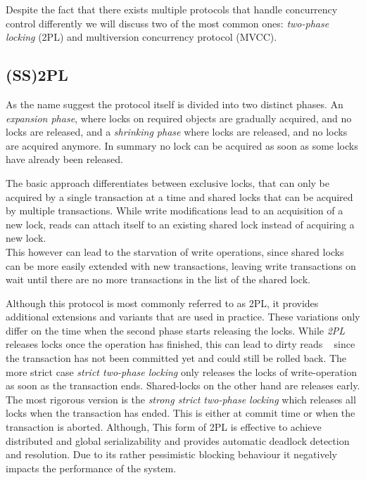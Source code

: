 Despite the fact that there exists multiple protocols that handle concurrency control differently we will discuss two of the most common ones: 
\emph{two-phase locking} (2PL) and multiversion concurrency protocol (MVCC).




\subsection{(SS)2PL}

As the name suggest the protocol itself is divided into two distinct phases. An \emph{expansion phase}, where locks on required objects are gradually acquired, 
and no locks are released, and a \emph{shrinking phase} where locks are released, and no locks are acquired anymore.
In summary no lock can be acquired as soon as some locks have already been released.

The basic approach differentiates between exclusive locks, that can only be acquired by a single transaction at a time and shared locks that 
can be acquired by multiple transactions. While write modifications lead to an acquisition of a new lock, reads can attach itself to an existing shared lock 
instead of acquiring a new lock. \\
This however can lead to the starvation of write operations, since shared locks can be more easily extended with new transactions, leaving write transactions on wait until 
there are no more transactions in the list of the shared lock. 

Although this protocol is most commonly referred to as 2PL, it provides additional extensions and variants that are used in practice. 
These variations only differ on the time when the second phase starts releasing the locks. 
While \emph{2PL} releases locks once the operation has finished, this can lead to dirty 
reads ~\cite{} since the transaction has not been committed yet and could still be rolled back.
The more strict case \emph{strict two-phase locking} only releases the locks of write-operation as soon as the transaction ends.
Shared-locks on the other hand are releases early.
The most rigorous version is the \emph{strong strict two-phase locking} which releases all locks when the transaction has ended.
This is either at commit time or when the transaction is aborted.
Although, This form of 2PL is effective to achieve distributed and global serializability and provides automatic deadlock detection and resolution.
Due to its rather pessimistic blocking behaviour it negatively impacts the performance of the system.



